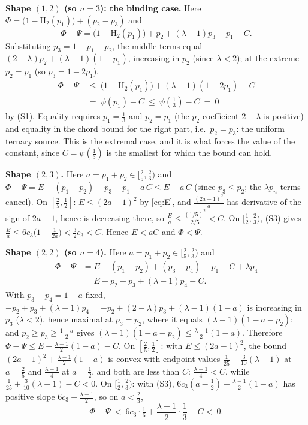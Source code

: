 \documentclass[journal]{IEEEtran}
\theoremstyle{definition}
\newcommand{\Hh}{\mathrm H_2}
\newcommand{\CC}{C}
\newcommand{\lam}{\lambda}
\newcommand{\cthree}{c_3}
\begin{document}
\medskip\noindent\textbf{Shape $(1,2)$ (so $n=3$): the binding case.}
Here $\Phi=\bigl(1-\Hh(p_1)\bigr)+(p_2-p_3)$ and
\[
  \Phi-\Psi=\bigl(1-\Hh(p_1)\bigr)+p_2+(\lam-1)p_3-p_1-\CC .
\]
Substituting $p_3=1-p_1-p_2$, the middle terms equal
$(2-\lam)p_2+(\lam-1)(1-p_1)$, increasing in $p_2$ (since $\lam<2$); at
the extreme $p_2=p_1$ (so $p_3=1-2p_1$),
\[
\begin{aligned}
  \Phi-\Psi\ &\le\ \bigl(1-\Hh(p_1)\bigr)+(\lam-1)(1-2p_1)-\CC\\
  &=\ \psi(p_1)-\CC\ \le\ \psi(\tfrac13)-\CC\ =\ 0
\end{aligned}
\]
by (S1). Equality requires
$p_1=\tfrac13$ and $p_2=p_1$ (the $p_2$-coefficient $2-\lam$ is
positive) and equality in the chord bound for the right part, i.e.\
$p_2=p_3$: the uniform ternary source. This is the extremal case, and it is
what forces the value of the constant, since $\CC=\psi(\tfrac13)$ is the
smallest for which the bound can hold.

\medskip\noindent\textbf{Shape $(2,3)$.}
Here $a=p_1+p_2\in[\tfrac25,\tfrac23)$ and
$\Phi-\Psi=E+(p_1-p_2)+p_3-p_1-a\,\CC\le E-a\,\CC$ (since $p_3\le p_2$; the
$\lam p_n$-terms cancel). On
$[\tfrac25,\tfrac12]$: $E\le(2a-1)^2$ by \eqref{eq:E}, and
$\tfrac{(2a-1)^2}{a}$ has derivative of the sign of $2a-1$, hence is decreasing
there, so $\tfrac Ea\le\tfrac{(1/5)^2}{2/5}<\CC$. On
$[\tfrac12,\tfrac23)$, (S3) gives
$\tfrac Ea\le6\cthree\bigl(1-\tfrac1{2a}\bigr)<\tfrac32\cthree<\CC$. Hence
$E<a\CC$ and $\Phi<\Psi$.

\medskip\noindent\textbf{Shape $(2,2)$ (so $n=4$).}
Here $a=p_1+p_2\in[\tfrac25,\tfrac23)$ and
\[
\begin{aligned}
  \Phi-\Psi&=E+(p_1-p_2)+(p_3-p_4)-p_1-\CC+\lam p_4\\
   &=E-p_2+p_3+(\lam-1)p_4-\CC .
\end{aligned}
\]
With $p_3+p_4=1-a$ fixed,
$-p_2+p_3+(\lam-1)p_4=-p_2+(2-\lam)p_3+(\lam-1)(1-a)$
is increasing in $p_3$ ($\lam<2$), hence maximal at $p_3=p_2$, where it equals
$(\lam-1)(1-a-p_2)$; and $p_2\ge p_3\ge\tfrac{1-a}{2}$ gives
$(\lam-1)(1-a-p_2)\le\tfrac{\lam-1}{2}(1-a)$. Therefore
$\Phi-\Psi\le E+\tfrac{\lam-1}{2}(1-a)-\CC$. On $[\tfrac25,\tfrac12]$: with
$E\le(2a-1)^2$, the bound $(2a-1)^2+\tfrac{\lam-1}{2}(1-a)$ is convex with
endpoint values $\tfrac1{25}+\tfrac3{10}(\lam-1)$ at $a=\tfrac25$ and
$\tfrac{\lam-1}{4}$ at $a=\tfrac12$, and both are less than $\CC$:
$\tfrac{\lam-1}4<\CC$, while
$\tfrac1{25}+\tfrac3{10}(\lam-1)-\CC<0$. On $[\tfrac12,\tfrac23)$:
with (S3), $6\cthree(a-\tfrac12)+\tfrac{\lam-1}{2}(1-a)$ has positive slope
$6\cthree-\tfrac{\lam-1}{2}$, so on $a<\tfrac23$,
\[
  \Phi-\Psi\ <\ 6\cthree\cdot\tfrac16+\frac{\lam-1}{2}\cdot\frac13-\CC
  <\ 0. 
\]
\end{document}
